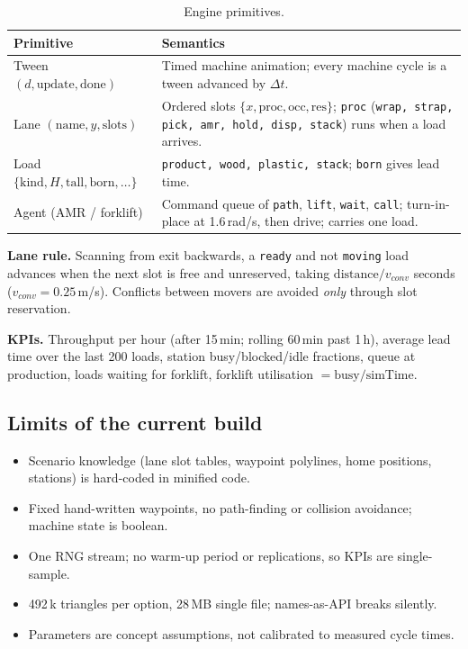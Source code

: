 \documentclass[11pt,a4paper]{article}
\begin{document}
\begin{table}[htbp]
\centering\small
\begin{tabularx}{\linewidth}{@{}l X@{}}
\toprule
\textbf{Primitive} & \textbf{Semantics}\\
\midrule
Tween $(d, \text{update}, \text{done})$ & Timed machine animation; every machine cycle is a tween advanced by $\Delta t$.\\
Lane $(\text{name}, y, \text{slots})$ & Ordered slots $\{x, \text{proc}, \text{occ}, \text{res}\}$; \texttt{proc} (\texttt{wrap, strap, pick, amr, hold, disp, stack}) runs when a load arrives.\\
Load $\{\text{kind}, H, \text{tall}, \text{born}, \dots\}$ & \texttt{product, wood, plastic, stack}; \texttt{born} gives lead time.\\
Agent (AMR / forklift) & Command queue of \texttt{path}, \texttt{lift}, \texttt{wait}, \texttt{call}; turn-in-place at 1.6\,rad/s, then drive; carries one load.\\
\bottomrule
\end{tabularx}
\caption{Engine primitives.}
\end{table}

\textbf{Lane rule.} Scanning from exit backwards, a \texttt{ready} and not \texttt{moving} load advances when the next slot
is free and unreserved, taking $\text{distance}/v_{conv}$ seconds ($v_{conv}=0.25$\,m/s). Conflicts between movers are avoided \emph{only}
through slot reservation.

\textbf{KPIs.} Throughput per hour (after 15\,min; rolling 60\,min past 1\,h), average lead time over the last 200 loads,
station busy/blocked/idle fractions, queue at production, loads waiting for forklift, forklift utilisation $=\text{busy}/\text{simTime}$.

\subsection{Limits of the current build}
\begin{itemize}[leftmargin=*,itemsep=1pt]
  \item Scenario knowledge (lane slot tables, waypoint polylines, home positions, stations) is hard-coded in minified code.
  \item Fixed hand-written waypoints, no path-finding or collision avoidance; machine state is boolean.
  \item One RNG stream; no warm-up period or replications, so KPIs are single-sample.
  \item 492\,k triangles per option, 28\,MB single file; names-as-API breaks silently.
  \item Parameters are concept assumptions, not calibrated to measured cycle times.
\end{itemize}
\end{document}
